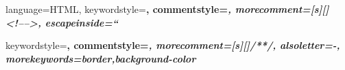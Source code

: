 {
	language=HTML,
	keywordstyle=\color{blue}\bfseries,
	commentstyle=\color{gray}\itshape,
	morecomment=[s][\color{gray}]{<!--}{-->},
	escapeinside=``
}

{
	keywordstyle=\color{cssKeyword}\bfseries,
	commentstyle=\color{gray}\itshape,
	morecomment=[s][\color{gray}]{/*}{*/},
	alsoletter=-,
	morekeywords={border,background-color}
}
